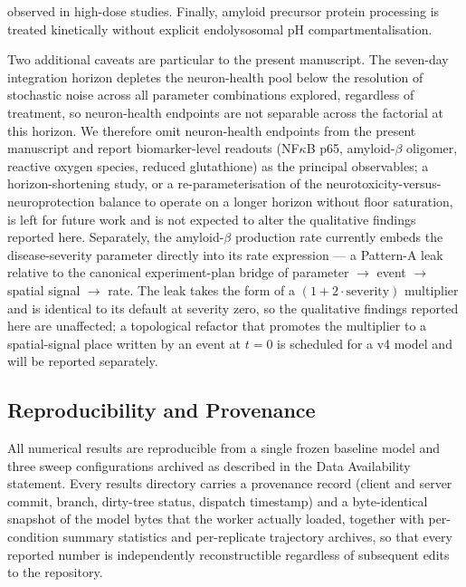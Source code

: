 \documentclass[10pt,letterpaper]{article}
\begin{document}
observed in high-dose studies. Finally, amyloid precursor protein processing is treated kinetically without explicit endolysosomal pH compartmentalisation.

Two additional caveats are particular to the present manuscript. The seven-day integration horizon depletes the neuron-health pool below the resolution of stochastic noise across all parameter combinations explored, regardless of treatment, so neuron-health endpoints are not separable across the factorial at this horizon. We therefore omit neuron-health endpoints from the present manuscript and report biomarker-level readouts (NF$\kappa$B p65, amyloid-$\beta$ oligomer, reactive oxygen species, reduced glutathione) as the principal observables; a horizon-shortening study, or a re-parameterisation of the neurotoxicity-versus-neuroprotection balance to operate on a longer horizon without floor saturation, is left for future work and is not expected to alter the qualitative findings reported here. Separately, the amyloid-$\beta$ production rate currently embeds the disease-severity parameter directly into its rate expression --- a Pattern-A leak relative to the canonical experiment-plan bridge of parameter $\rightarrow$ event $\rightarrow$ spatial signal $\rightarrow$ rate. The leak takes the form of a $(1 + 2 \cdot \text{severity})$ multiplier and is identical to its default at severity zero, so the qualitative findings reported here are unaffected; a topological refactor that promotes the multiplier to a spatial-signal place written by an event at $t = 0$ is scheduled for a v4 model and will be reported separately.

\subsection{Reproducibility and Provenance}

All numerical results are reproducible from a single frozen baseline model and three sweep configurations archived as described in the Data Availability statement. Every results directory carries a provenance record (client and server commit, branch, dirty-tree status, dispatch timestamp) and a byte-identical snapshot of the model bytes that the worker actually loaded, together with per-condition summary statistics and per-replicate trajectory archives, so that every reported number is independently reconstructible regardless of subsequent edits to the repository.

\end{document}
